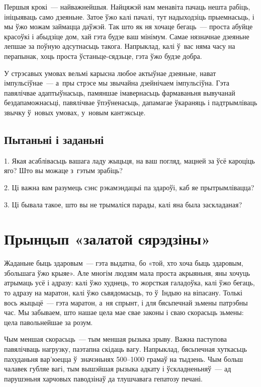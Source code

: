 Першыя крокі~--- найважнейшыя. Найцяжэй нам менавіта пачаць нешта рабіць, ініцыяваць само дзеяньне. Затое ўжо калі пачалі, тут надыходзіць прыемнасьць, і мы ўжо можам займацца даўжэй. Так што як ня хочаце бегаць~--- проста абуйце красоўкі і абыдзіце дом, хай гэта будзе ваш мінімум. Самае нязначнае дзеяньне лепшае за поўную адсутнасьць такога. Напрыклад, калі ў~вас няма часу на перапынак, хоць проста ўстаньце-сядзьце, гэта ўжо будзе добра.

У стрэсавых умовах вельмі карысна любое актыўнае дзеяньне, нават імпульсіўнае~--- а~пры стрэсе мы звычайна дзейнічаем імпульсіўна. Гэта павялічвае адаптыўнасьць, памяншае імавернасьць фармаваньня вывучанай бездапаможнасьці, павялічвае ўпэўненасьць, дапамагае ўкараняць і падтрымліваць звычку ў~новых умовах, у~новым кантэксьце.

\subsection*{Пытаньні і заданьні}

1. Якая асаблівасьць вашага ладу жыцьця, на ваш погляд, мацней за ўсё кароціць яго? Што вы можаце з~гэтым зрабіць?

2. Ці важна вам разумець сэнс рэкамэндацыі па здароўі, каб яе прытрымлівацца?

3. Ці бывала такое, што вы не трымаліся парады, калі яна была заскладаная?


\section{Прынцып «залатой сярэдзіны»}

Жаданьне быць здаровым~--- гэта выдатна, бо «той, хто хоча быць здаровым, збольшага ўжо крыяе». Але многім людзям мала проста акрыяньня, яны хочуць атрымаць усё і адразу: калі ўжо худнець, то жорсткая галадоўка, калі ўжо бегаць, то адразу на маратон, калі ўжо сьвядомасьць, то ў~Індыю на віпасану. Толькі вось жыцьцё~--- гэта маратон, а~ня спрынт, і для бясьпечнай зьмены патрэбны час. Мы забываем, што нашае цела мае свае законы і сваю скорасьць зьмены: цела павольнейшае за розум.

Чым меншая скорасьць~--- тым меншая рызыка зрыву. Важна паступова павялічваць нагрузку, паэтапна скідаць вагу. Напрыклад, бясьпечная хуткасьць пахуданьня вар'юецца ў~значэньнях 500--1000 грамаў на тыдзень. Чым больш чалавек губляе вагі, тым вышэйшая рызыка адкату і ўскладненьняў~--- ад парушэньня харчовых паводзінаў да тлушчавага гепатозу печані.

